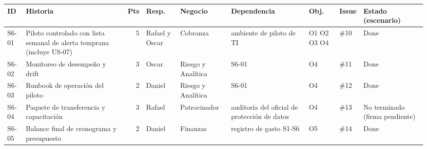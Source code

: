 \scriptsize
\begin{tabularx}{\linewidth}{l X r p{1.5cm} p{1.7cm} p{2.3cm} p{1.1cm} l p{1.9cm}}
\toprule
\textbf{ID} & \textbf{Historia} & \textbf{Pts} & \textbf{Resp.} & \textbf{Negocio} & \textbf{Dependencia} & \textbf{Obj.} & \textbf{Issue} & \textbf{Estado (escenario)} \\
\midrule
S6-01 & Piloto controlado con lista semanal de alerta temprana (incluye US-07) & 5 & Rafael y Oscar & Cobranza & ambiente de piloto de TI & O1 O2 O3 O4 & \#10 & Done \\
S6-02 & Monitoreo de desempeño y drift & 3 & Oscar & Riesgo y Analítica & S6-01 & O4 & \#11 & Done \\
S6-03 & Runbook de operación del piloto & 2 & Daniel & Riesgo y Analítica & S6-01 & O4 & \#12 & Done \\
S6-04 & Paquete de transferencia y capacitación & 3 & Rafael & Patrocinador & auditoría del oficial de protección de datos & O4 & \#13 & No terminado (firma pendiente) \\
S6-05 & Balance final de cronograma y presupuesto & 2 & Daniel & Finanzas & registro de gasto S1-S6 & O5 & \#14 & Done \\
\bottomrule
\end{tabularx}
